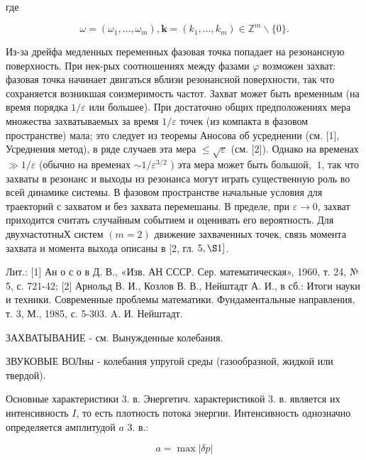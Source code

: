 \documentclass[10pt]{article}
\begin{document}
где



\[

\omega=\left(\omega_{1}, \ldots, \omega_{m}\right), \boldsymbol{k}=\left(k_{1}, \ldots, k_{m}\right) \in \mathbb{Z}^{m} \backslash\{0\} .

\]



Из-за дрейфа медленных переменных фазовая точка попадает на резонансную поверхность. При нек-рых соотношениях между фазами $\varphi$ возможен захват: фазовая точка начинает двигаться вблизи резонансной поверхности, так что сохраняется возникшая соизмеримость частот. Захват может быть временным (на время порядка $1 / \varepsilon$ или большее). При достаточно общих предположениях мера множества захватываемых за время $1 / \varepsilon$ точек (из компакта в фазовом пространстве) мала; это следует из теоремы Аносова об усреднении (см. [1], Усреднения метод), в ряде случаев эта мера $\leqslant \sqrt{\varepsilon}$ (см. [2]). Однако на временах $\gg 1 / \varepsilon$ (обычно на временах $\sim 1 / \varepsilon^{3 / 2}$ ) эта мера может быть большой, $~ 1$, так что захваты в резонанс и выходы из резонанса могут играть существенную роль во всей динамике системы. В фазовом пространстве начальные условия для траекторий с захватом и без захвата перемешаны. В пределе, при $\varepsilon \rightarrow 0$, захват приходится считать случайным событием и оценивать его вероятность. Для двухчастотныХ систем $(m=2)$ движение захваченных точек, связь момента захвата и момента выхода описаны в [2, гл. $5, \S 1]$.



Лит.: [1] Ан о с о в Д. В., «Изв. АН СССР. Сер. математическая», 1960, т. 24, № 5, с. 721-42; [2] Арнольд В. И., Козлов В. В., Нейштадт А. И., в сб.: Итоги науки и техники. Современные проблемы математики. Фундаментальные направления, т. 3, М., 1985, с. 5-303. A. И. Нейштадт.



ЗАХВАТЫВАНИЕ - см. Вынужденные колебания.



ЗВУКОВЫЕ ВОЛны - колебания упругой среды (газообразной, жидкой или твердой).



Основные характеристики 3. в. Энергетич. характеристикой 3. в. является их интенсивность $I$, то есть плотность потока энергии. Интенсивность однозначно определяется амплитудой $a$ 3. в.:



\[

a=\max |\delta p|

\]
\end{document}
